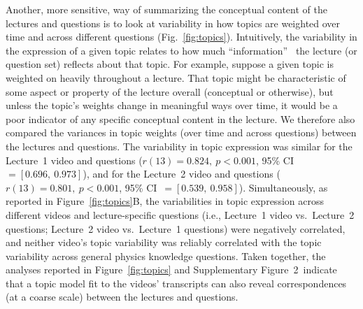 \documentclass[10pt]{article}
\newcommand{\topicWeights}{2}
\begin{document}
Another, more sensitive, way of summarizing the conceptual content of the
lectures and questions is to look at variability in how topics are
weighted over time and across different questions (Fig.~\ref{fig:topics}).
Intuitively, the variability in the expression of a given topic relates to how
much ``information''~\citep{Fish22} the lecture (or question set) reflects
about that topic. For example, suppose a given topic is weighted on heavily
throughout a lecture. That topic might be characteristic of some aspect or
property of the lecture overall (conceptual or otherwise), but unless
the topic's weights change in meaningful ways over time, it would be a
poor indicator of any specific conceptual content in the lecture. We
therefore also compared the variances in topic weights (over time and across
questions) between the lectures and questions. The variability in topic
expression was similar for the Lecture~1 video
and questions ($r(13) = 0.824,~p<0.001$, 95\% CI~$= [0.696,~0.973]$), and for the
Lecture~2 video and questions ($r(13) = 0.801,~p<0.001$, 95\% CI~$=
[0.539,~0.958]$). Simultaneously, as reported in Figure~\ref{fig:topics}B, the
variabilities in topic expression across different videos and
lecture-specific questions (i.e., Lecture~1 video vs.~Lecture~2 questions;
Lecture~2 video vs.~Lecture~1 questions) were negatively correlated, and
neither video's topic variability was reliably correlated with the topic
variability across general physics knowledge questions. Taken together, the
analyses reported in Figure~\ref{fig:topics} and Supplementary
Figure~\topicWeights~indicate that a topic model fit to the videos' transcripts
can also reveal correspondences (at a coarse scale) between the lectures and
questions.
\end{document}
